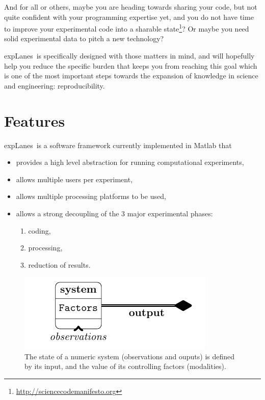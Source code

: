 \documentclass[a4paper,fleqn]{tufte-handout}
\newcommand{\explanes}{\textsf{expLanes}\ }
\begin{document}
And for all or others, maybe you are heading towards sharing your code\cite{depsy}, but not quite confident with your programming expertise yet, and you do not have time to improve your experimental code into a sharable state\footnote{\url{http://sciencecodemanifesto.org}}? Or maybe you need solid experimental data to pitch a new technology?

\explanes is specifically designed with those matters in mind, and will hopefully help you reduce the specific burden that keeps you from reaching this goal which is one of the most important steps towards the expansion of knowledge in science and engineering: reproducibility\cite{science, sp}.

\section{Features}
\hypertarget{Features}{} 

\explanes is a software framework currently implemented in Matlab that 
\begin{itemize}
\item provides a high level abstraction for running computational experiments,
\item allows multiple users per experiment,
\item allows multiple processing platforms to be used,
\item allows a strong decoupling of the 3 major experimental phases: 
\begin{enumerate}
\item coding,
\item processing,
\item reduction of results.
\end{enumerate}
\end{itemize}

\begin{figure}[h]
  \begin{center}
    \leavevmode
  \includegraphics[width=.6\textwidth]{figures/factors1}
    \caption{The state of a numeric system (observations and ouputs) is defined by its input, and the value of its controlling factors (modalities).}
    \label{step1}
  \end{center}
\end{figure}
\end{document}
